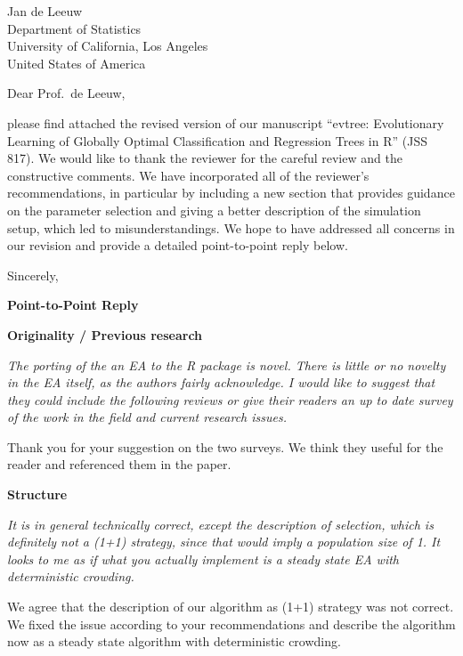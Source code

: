 \documentclass[DIN, pagenumber=false, parskip=half,%
               fromalign=left, fromphone=true,%
               fromemail=true, fromurl=false, %
               fromlogo=true, fromrule=false, fromrule=afteraddress]{scrlttr2}
\begin{document}
\begin{letter}{
  Jan de Leeuw\\
  Department of Statistics\\
  University of California, Los Angeles\\
  United States of America
}

\opening{Dear Prof.~de Leeuw,}

please find attached the revised version of our manuscript
``evtree: Evolutionary Learning of Globally Optimal Classification and Regression Trees in R''
(JSS 817). We would like to thank the reviewer for the careful review and the constructive
comments. We have incorporated all of the reviewer's recommendations,
in particular by including a new section that provides guidance on the parameter selection and
giving a better description of the simulation setup, which led to misunderstandings.
We hope to have addressed all concerns in our revision and provide a detailed
point-to-point reply below.

Sincerely,\\[-2cm]
\closing{}

\end{letter}


\newpage


\textbf{\large Point-to-Point Reply}

\bigskip

\textbf{Originality / Previous research}

\textit{The porting of the an EA to the R package is novel.  There is
little or no novelty in the EA itself, as the authors fairly acknowledge. 
I would like to suggest that they could include the following
reviews or give their readers an up to date survey of the work 
in the field and current research issues.}

Thank you for your suggestion on the two surveys. We think they useful
for the reader and referenced them in the paper.

\bigskip

\textbf{Structure}

\textit{It is in general technically 
correct,  except the description of selection, which is definitely 
not a (1+1) strategy, since that would imply a population size of 1.
It looks to me as if what you actually implement is a steady state 
EA with  deterministic crowding.} 

We agree that the description of our algorithm as (1+1) strategy was not correct.
We fixed the issue according to your recommendations and describe the algorithm now
as a steady state algorithm with deterministic crowding.
\end{document}
